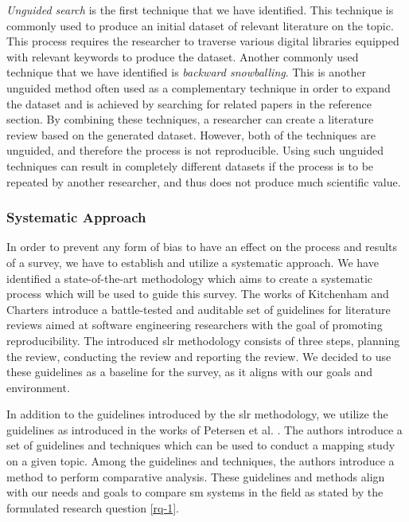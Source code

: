 

\textit{Unguided search} is the first technique that we have identified. This technique is commonly used to produce an initial dataset of relevant literature on the topic. This process requires the researcher to traverse various digital libraries equipped with relevant keywords to produce the dataset. Another commonly used technique that we have identified is \textit{backward snowballing}. This is another unguided method often used as a complementary technique in order to expand the dataset and is achieved by searching for related papers in the reference section. By combining these techniques, a researcher can create a literature review based on the generated dataset. However, both of the techniques are unguided, and therefore the process is not reproducible. Using such unguided techniques can result in completely different datasets if the process is to be repeated by another researcher, and thus does not produce much scientific value. 

\subsubsection{Systematic Approach}
\label{sec:survey:methodology:strategy:systematic}

In order to prevent any form of bias to have an effect on the process and results of a survey, we have to establish and utilize a systematic approach. We have identified a state-of-the-art methodology which aims to create a systematic process which will be used to guide this survey. The works of Kitchenham and Charters \cite{Kitchenham2007} introduce a battle-tested and auditable set of guidelines for literature reviews aimed at software engineering researchers  with the goal of promoting reproducibility. The introduced \gls{slr} methodology consists of three steps, planning the review, conducting the review and reporting the review. We decided to use these guidelines as a baseline for the survey, as it aligns with our goals and environment.

In addition to the guidelines introduced by the \gls{slr} methodology, we utilize the guidelines as introduced in the works of Petersen et al. \cite{Petersen2008}\cite{Petersen2015}. The authors introduce a set of guidelines and techniques which can be used to conduct a mapping study on a given topic. Among the guidelines and techniques, the authors introduce a method to perform comparative analysis. These guidelines and methods align with our needs and goals to compare \gls{sm} systems in the field as stated by the formulated research question \ref{rq-1}. 


